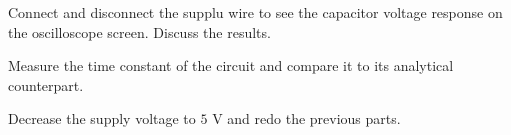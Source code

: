 \documentclass[11pt]{article}
\begin{document}
\begin{question}
    \begin{subquestion}{Connect and disconnect the supplu wire to see the capacitor voltage response on the oscilloscope screen. Discuss the results.}
        \answer{}
    \end{subquestion}

    \begin{subquestion}{Measure the time constant of the circuit and compare it to its analytical counterpart.}
        \answer{}
    \end{subquestion}

    \begin{subquestion}{Decrease the supply voltage to $5$ V and redo the previous parts.}
        \answer{}
    \end{subquestion}


\end{question}

\end{document}
